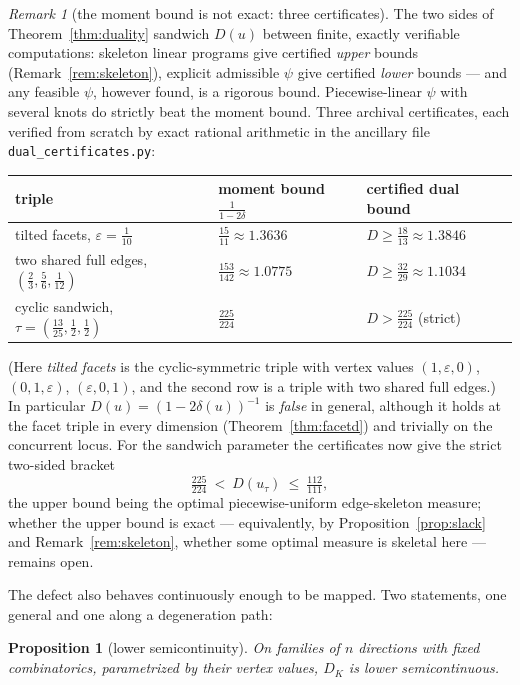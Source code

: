 \documentclass[11pt,reqno]{amsart}
\theoremstyle{plain}
\newtheorem{proposition}[theorem]{Proposition}
\theoremstyle{definition}
\theoremstyle{remark}
\newtheorem{remark}[theorem]{Remark}
\begin{document}
\begin{remark}[the moment bound is not exact: three certificates]
\label{rem:sandwich}
The two sides of Theorem~\ref{thm:duality} sandwich $D(u)$ between finite,
exactly verifiable computations: skeleton linear programs give certified
\emph{upper} bounds (Remark~\ref{rem:skeleton}), explicit admissible $\psi$
give certified \emph{lower} bounds --- and any feasible $\psi$, however
found, is a rigorous bound. Piecewise-linear $\psi$ with several knots do
strictly beat the moment bound. Three archival certificates, each verified
from scratch by exact rational arithmetic in the ancillary file
\texttt{dual\_certificates.py}:
\begin{center}
\begin{tabular}{@{}lll@{}}
\hline
triple & moment bound $\tfrac1{1-2\delta}$ & certified dual bound\\
\hline
tilted facets, $\varepsilon=\tfrac1{10}$ & $\tfrac{15}{11}\approx1.3636$
 & $D\ge\tfrac{18}{13}\approx1.3846$\\
two shared full edges, $(\tfrac23,\tfrac56,\tfrac1{12})$
 & $\tfrac{153}{142}\approx1.0775$ & $D\ge\tfrac{32}{29}\approx1.1034$\\
cyclic sandwich, $\tau=(\tfrac{13}{25},\tfrac12,\tfrac12)$
 & $\tfrac{225}{224}$ & $D>\tfrac{225}{224}$ (strict)\\
\hline
\end{tabular}
\end{center}
(Here \emph{tilted facets} is the cyclic-symmetric triple with vertex values
$(1,\varepsilon,0)$, $(0,1,\varepsilon)$, $(\varepsilon,0,1)$, and the
second row is a triple with two shared full edges.) In particular
$D(u)=(1-2\delta(u))^{-1}$ is \emph{false} in general, although it holds at
the facet triple in every dimension (Theorem~\ref{thm:facetd}) and trivially
on the concurrent locus. For the sandwich parameter the certificates now
give the strict two-sided bracket
\[
\tfrac{225}{224}\ <\ D(u_\tau)\ \le\ \tfrac{112}{111},
\]
the upper bound being the optimal piecewise-uniform edge-skeleton measure;
whether the upper bound is exact --- equivalently, by
Proposition~\ref{prop:slack} and Remark~\ref{rem:skeleton}, whether some
optimal measure is skeletal here --- remains open.
\end{remark}

The defect also behaves continuously enough to be mapped. Two statements,
one general and one along a degeneration path:

\begin{proposition}[lower semicontinuity]\label{prop:lsc}
On families of $n$ directions with fixed combinatorics, parametrized by
their vertex values, $D_K$ is lower semicontinuous.
\end{proposition}
\end{document}

